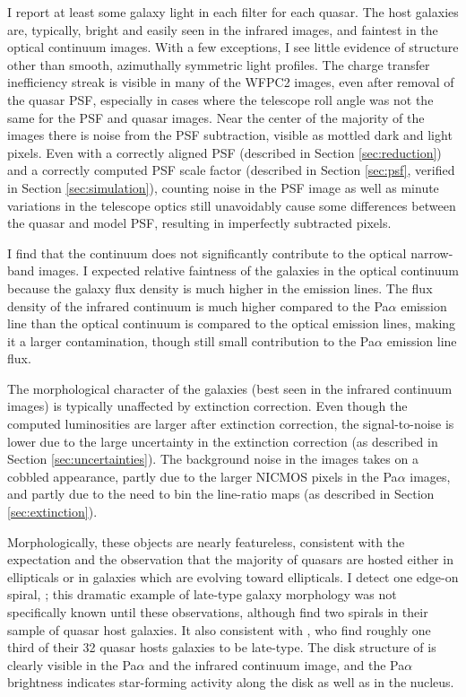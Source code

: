 I report at least some galaxy light in each filter for each quasar.  The host galaxies are, typically, bright and easily seen in the infrared images, and faintest in the optical continuum images. With a few exceptions, I see little evidence of structure other than smooth, azimuthally symmetric light profiles. The charge transfer inefficiency streak is visible in many of the WFPC2 images, even after removal of the quasar PSF, especially in cases where the telescope roll angle was not the same for the PSF and quasar images.  Near the center of the majority of the images there is noise from the PSF subtraction, visible as mottled dark and light pixels. Even with a correctly aligned PSF (described in Section \ref{sec:reduction}) and a correctly computed PSF scale factor (described in Section \ref{sec:psf}, verified in Section \ref{sec:simulation}), counting noise in the PSF image as well as minute variations in the telescope optics \citep{NICMOS} still unavoidably cause some differences between the quasar and model PSF, resulting in imperfectly subtracted pixels.

I find that the continuum does not significantly contribute to the optical narrow-band images. I expected relative faintness of the galaxies in the optical continuum because the galaxy flux density is much higher in the emission lines. The flux density of the infrared continuum is much higher compared to the Pa$\alpha$ emission line than the optical continuum is compared to the optical emission lines, making it a larger contamination, though still small contribution to the Pa$\alpha$ emission line flux.

The morphological character of the galaxies (best seen in the infrared continuum images) is typically unaffected by extinction correction. Even though the computed luminosities are larger after extinction correction, the signal-to-noise is lower due to the large uncertainty in the extinction correction (as described in Section \ref{sec:uncertainties}). The background noise in the images takes on a cobbled appearance, partly due to the larger NICMOS pixels in the Pa$\alpha$ images, and partly due to the need to bin the line-ratio maps (as described in Section \ref{sec:extinction}).

Morphologically, these objects are nearly featureless, consistent with the expectation \citep{McLeod_Rieke,Taylor} and the observation \citep{McLeod} that the majority of quasars are hosted either in ellipticals or in galaxies which are evolving toward ellipticals.  I detect one edge-on spiral, ; this dramatic example of late-type galaxy morphology was not specifically known until these observations, although \cite{McLeod} find two spirals in their sample of quasar host galaxies.  It also consistent with \cite{Guyon}, who find roughly one third of their 32 quasar hosts galaxies to be late-type.  The disk structure of  is clearly visible in the Pa$\alpha$ and the infrared continuum image, and the Pa$\alpha$ brightness indicates star-forming activity along the disk as well as in the nucleus.

